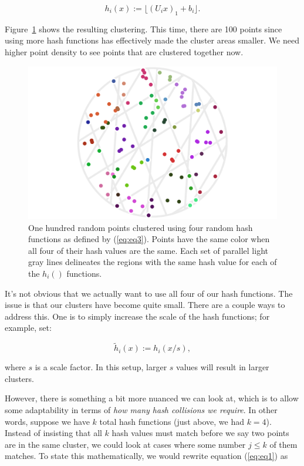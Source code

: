 \documentclass[20pt,]{extarticle}
\begin{document}
\begin{equation} h_i(x) := \lfloor (U_i x)_1 + b_i \rfloor. \label{eq:eq3}\end{equation}

Figure~\ref{fig:fig4} shows the resulting clustering. This time, there
are 100 points since using more hash functions has effectively made the
cluster areas smaller. We need higher point density to see points that
are clustered together now.

\begin{figure}
\centering
\includegraphics{images/lsh_image4.png}
\caption{One hundred random points clustered using four random hash
functions as defined by (\ref{eq:eq3}). Points have the same color when
all four of their hash values are the same. Each set of parallel light
gray lines delineates the regions with the same hash value for each of
the \(h_i()\) functions.}\label{fig:fig4}
\end{figure}

It's not obvious that we actually want to use all four of our hash
functions. The issue is that our clusters have become quite small. There
are a couple ways to address this. One is to simply increase the scale
of the hash functions; for example, set:

\[ \tilde h_i(x) := h_i(x/s), \]

where \(s\) is a scale factor. In this setup, larger \(s\) values will
result in larger clusters.

However, there is something a bit more nuanced we can look at, which is
to allow some adaptability in terms of \emph{how many hash collisions we
require}. In other words, suppose we have \(k\) total hash functions
(just above, we had \(k=4\)). Instead of insisting that all \(k\) hash
values must match before we say two points are in the same cluster, we
could look at cases where some number \(j \le k\) of them matches. To
state this mathematically, we would rewrite equation (\ref{eq:eq1}) as
\end{document}
